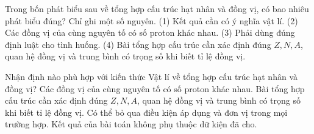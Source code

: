 \begin{ex}
Trong bốn phát biểu sau về tổng hợp cấu trúc hạt nhân và đồng vị, có bao nhiêu phát biểu đúng? Chỉ ghi một số nguyên. (1) Kết quả cần có ý nghĩa vật lí. (2) Các đồng vị của cùng nguyên tố có số proton khác nhau. (3) Phải dùng đúng định luật cho tình huống. (4) Bài tổng hợp cấu trúc cần xác định đúng $Z,N,A$, quan hệ đồng vị và trung bình có trọng số khi biết tỉ lệ đồng vị.
\end{ex}

\begin{ex}
Nhận định nào phù hợp với kiến thức Vật lí về tổng hợp cấu trúc hạt nhân và đồng vị?
\choice
{Các đồng vị của cùng nguyên tố có số proton khác nhau.}
{\True Bài tổng hợp cấu trúc cần xác định đúng $Z,N,A$, quan hệ đồng vị và trung bình có trọng số khi biết tỉ lệ đồng vị.}
{Có thể bỏ qua điều kiện áp dụng và đơn vị trong mọi trường hợp.}
{Kết quả của bài toán không phụ thuộc dữ kiện đã cho.}
\end{ex}

